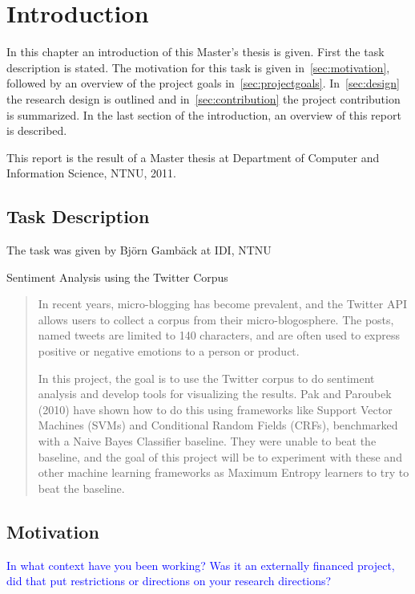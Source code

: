 \chapter{Introduction}

In this chapter an introduction of this Master's thesis is given. First the task description is stated. The motivation for this task is given in~\autoref{sec:motivation}, followed by an overview of the project goals in~\autoref{sec:projectgoals}. In~\autoref{sec:design} the research design is outlined and in~\autoref{sec:contribution} the project contribution is summarized. In the last section of the introduction, an overview of this report is described. 

This report is the result of a Master thesis at Department of Computer and Information Science, NTNU, 2011. 

\section{Task Description}
\label{sec:task}

The task was given by Bj\"{o}rn Gamb\"{a}ck at IDI, NTNU

\begin{center} \Large Sentiment Analysis using the Twitter Corpus \end{center}
\begin{quotation}
In recent years, micro-blogging has become prevalent, and the Twitter API allows users to collect a corpus from their micro-blogosphere. The posts, named tweets are limited to 140 characters, and are often used to express positive or negative emotions to a person or product.

In this project, the goal is to use the Twitter corpus to do sentiment analysis and develop tools for visualizing the results. Pak and Paroubek (2010) have shown how to do this using frameworks like Support Vector Machines (SVMs) and Conditional Random Fields (CRFs), benchmarked with a Naive Bayes Classifier baseline. They were unable to beat the baseline, and the goal of this project will be to experiment with these and other machine learning frameworks as Maximum Entropy learners to try to beat the baseline.
\end{quotation}


\section{Motivation}
\label{sec:motivation}
\textcolor{blue}{In what context have you been working? Was it an externally financed project, did that put restrictions or directions on your research directions?}

